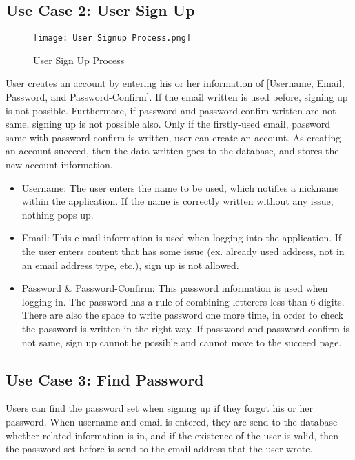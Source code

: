 \documentclass[conference]{IEEEtran}
\begin{document}
\subsection{Use Case 2: User Sign Up}
    \begin{figure}[htbp]
    \centerline{\texttt{[image: User Signup Process.png]}}
    \label{fig}
    \caption{User Sign Up Process}
    \end{figure}
User creates an account by entering his or her information of [Username, Email, Password, and Password-Confirm]. If the email written is used before, signing up is not possible. Furthermore, if password and password-confim written are not same, signing up is not possible also. Only if the firstly-used email, password same with password-confirm is written, user can create an account. As creating an account succeed, then the data written goes to the database, and stores the new account information.\\
\begin{itemize}
    \item Username: The user enters the name to be used, which notifies a nickname within the application. If the name is correctly written without any issue, nothing pops up.
    \item Email: This e-mail information is used when logging into the application. If the user enters content that has some issue (ex. already used address, not in an email address type, etc.), sign up is not allowed.
    \item Password & Password-Confirm: This password information is used when logging in. The password has a rule of combining letterers less than 6 digits. There are also the space to write password one more time, in order to check the password is written in the right way. If password and password-confirm is not same, sign up cannot be possible and cannot move to the succeed page.\\
\end{itemize}
    
\subsection{Use Case 3: Find Password}
Users can find the password set when signing up if they forgot his or her password. When username and email is entered, they are send to the database whether related information is in, and if the existence of the user is valid, then the password set before is send to the email address that the user wrote.\\
\end{document}
